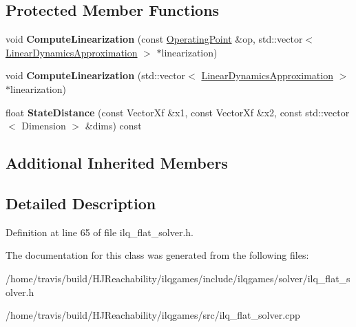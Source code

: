 \subsection*{Protected Member Functions}
\begin{DoxyCompactItemize}
\item 
void {\bfseries Compute\+Linearization} (const \hyperlink{structilqgames_1_1_operating_point}{Operating\+Point} \&op, std\+::vector$<$ \hyperlink{structilqgames_1_1_linear_dynamics_approximation}{Linear\+Dynamics\+Approximation} $>$ $\ast$linearization)\hypertarget{classilqgames_1_1_i_l_q_flat_solver_abcaec1afcd87975d5d9af23bae154939}{}\label{classilqgames_1_1_i_l_q_flat_solver_abcaec1afcd87975d5d9af23bae154939}

\item 
void {\bfseries Compute\+Linearization} (std\+::vector$<$ \hyperlink{structilqgames_1_1_linear_dynamics_approximation}{Linear\+Dynamics\+Approximation} $>$ $\ast$linearization)\hypertarget{classilqgames_1_1_i_l_q_flat_solver_a62a5f589fa336023dada5826b006b473}{}\label{classilqgames_1_1_i_l_q_flat_solver_a62a5f589fa336023dada5826b006b473}

\item 
float {\bfseries State\+Distance} (const Vector\+Xf \&x1, const Vector\+Xf \&x2, const std\+::vector$<$ Dimension $>$ \&dims) const \hypertarget{classilqgames_1_1_i_l_q_flat_solver_a75bc41b8d86d87d1af99d2daf8a75678}{}\label{classilqgames_1_1_i_l_q_flat_solver_a75bc41b8d86d87d1af99d2daf8a75678}

\end{DoxyCompactItemize}
\subsection*{Additional Inherited Members}


\subsection{Detailed Description}


Definition at line 65 of file ilq\+\_\+flat\+\_\+solver.\+h.



The documentation for this class was generated from the following files\+:\begin{DoxyCompactItemize}
\item 
/home/travis/build/\+H\+J\+Reachability/ilqgames/include/ilqgames/solver/ilq\+\_\+flat\+\_\+solver.\+h\item 
/home/travis/build/\+H\+J\+Reachability/ilqgames/src/ilq\+\_\+flat\+\_\+solver.\+cpp\end{DoxyCompactItemize}
